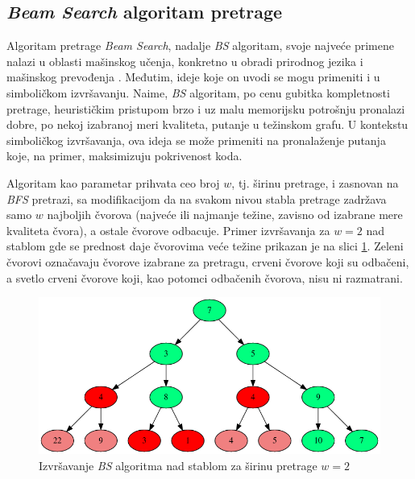 \documentclass[a4paper]{article}
\begin{document}
\subsection{\textit{Beam Search} algoritam pretrage}

Algoritam pretrage \textit{Beam Search}, nadalje \textit{BS} algoritam, svoje najveće primene nalazi u oblasti mašinskog učenja, konkretno u obradi prirodnog jezika i mašinskog prevođenja \cite{HarpySpeechRecognitionSystem, BeamSearchStrategiesForNeuralMachineTranslation, BestFirstBeamSearch}. Međutim, ideje koje on uvodi se mogu primeniti i u simboličkom izvršavanju. Naime, \textit{BS} algoritam, po cenu gubitka kompletnosti pretrage, heurističkim pristupom brzo i uz malu memorijsku potrošnju pronalazi dobre, po nekoj izabranoj meri kvaliteta, putanje u težinskom grafu. U kontekstu simboličkog izvršavanja, ova ideja se može primeniti na pronalaženje putanja koje, na primer, maksimizuju pokrivenost koda.

Algoritam kao parametar prihvata ceo broj $w$, tj. širinu pretrage, i zasnovan na \textit{BFS} pretrazi, sa modifikacijom da na svakom nivou stabla pretrage zadržava samo $w$ najboljih čvorova (najveće ili najmanje težine, zavisno od izabrane mere kvaliteta čvora), a ostale čvorove odbacuje. Primer izvršavanja za $w = 2$ nad stablom gde se prednost daje čvorovima veće težine prikazan je na slici \ref{fig:beam_search}. Zeleni čvorovi označavaju čvorove izabrane za pretragu, crveni čvorove koji su odbačeni, a svetlo crveni čvorove koji, kao potomci odbačenih čvorova, nisu ni razmatrani.

\begin{figure}[h!]
    \centering
    \includegraphics[width=\linewidth]{ilustracije/beam_search_primer.png}
    \caption{Izvršavanje \textit{BS} algoritma nad stablom za širinu pretrage $w = 2$}
    \label{fig:beam_search}
\end{figure}
\end{document}
